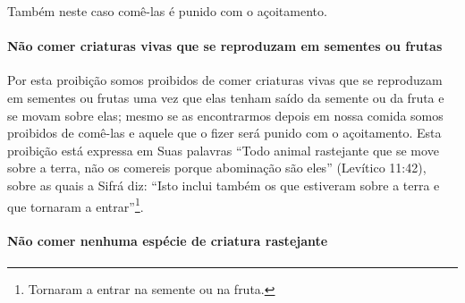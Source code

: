 Também neste caso comê-las é punido com o açoitamento.

\paragraph{Não comer criaturas vivas que se reproduzam em sementes ou frutas}

Por esta proibição somos proibidos de comer criaturas vivas que se
reproduzam em sementes ou frutas uma vez que elas tenham saído da
semente ou da fruta e se movam sobre elas; mesmo se as encontrarmos
depois em nossa comida somos proibidos de comê-las e aquele que o fizer
será punido com o açoitamento. Esta proibição está expressa em Suas
palavras ``Todo animal rastejante que se move sobre a terra, não os
comereis porque abominação são eles'' (Levítico 11:42), sobre as quais a
Sifrá diz: ``Isto inclui também os que estiveram sobre a terra e que
tornaram a entrar''\footnote{Tornaram a entrar na semente ou na fruta.}.

\paragraph{Não comer nenhuma espécie de criatura rastejante}

